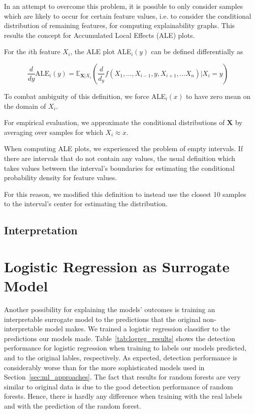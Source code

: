 \documentclass[sigconf,nonacm]{acmart}
\begin{document}
In an attempt to overcome this problem, it is possible to only consider samples which are likely to occur for certain feature values, i.e. to consider the conditional distribution of remaining features, for computing explainability graphs. This results the concept for Accumulated Local Effects (ALE) plots. 

For the $i$th feature $X_i$, the ALE plot ALE$_i(y)$ can be defined differentially as



\begin{equation}
\frac{d}{dy} \text{ALE}_i (y) = \mathbb E_{\boldsymbol X | X_i}\left(\frac{d}{d_y} f(X_1,\ldots,X_{i-1},y,X_{i+1},\ldots X_n) | X_i=y\right)
\end{equation}

To combat ambiguity of this definition, we force ALE$_i(x)$ to have zero mean on the domain of $X_i$.

For empirical evaluation, we approximate the conditional distributions of $\boldsymbol X$ by averaging over samples for which $X_i \approx x$. 

When computing ALE plots, we experienced the problem of empty intervals. If there are intervals  that do not contain any values, the usual definition which takes values between the interval's boundaries for estimating the conditional probability density for feature values. 

For this reason, we modified this definition to instead use the closest 10 samples to the interval's center for estimating the distribution.

\subsection{Interpretation}

\section{Logistic Regression as Surrogate Model}
Another possibility for explaining the models' outcomes is training an interpretable surrogate model to the predictions that the original non-interpretable model makes. We trained a logistic regression classifier to the predictions our models made. Table~\ref{tab:logreg_results} shows the detection performance for logistic regression when training to labels our models predicted, and to the original lables, respectively. As expected, detection performance is considerably worse than for the more sophisticated models used in Section~\ref{sec:ml_approaches}. The fact that results for random forests are very similar to original data is due to the good detection performance of random forests. Hence, there is hardly any difference when training with the real labels and with the prediction of the random forest.
\end{document}
